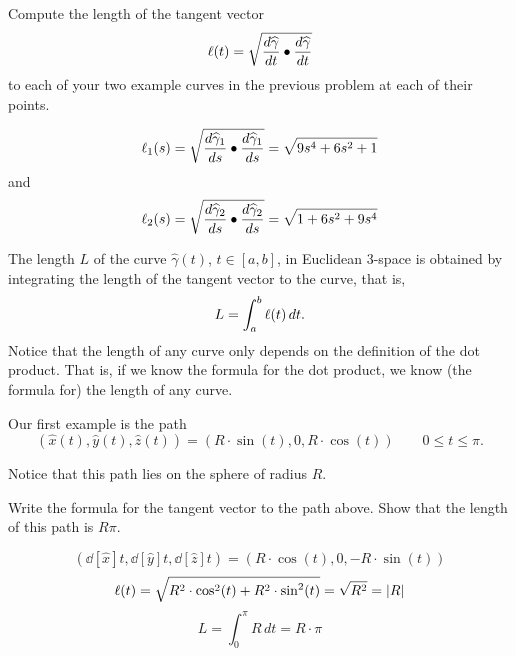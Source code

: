\documentclass[newpage,hints,handout]{ximera}
\begin{document}
\begin{problem}
Compute the length of the tangent vector
\[
\l(t)=\sqrt{\frac{d\hat{\gamma}}{dt}\bullet\frac{d\hat{\gamma}}{dt}}%
\]
to each of your two example curves in the previous problem at each of
their points.



\begin{freeResponse}
\[
\ell_{1}(s) = \sqrt{\frac{d\widehat{\gamma}_{1}}{ds}\bullet\frac{d\widehat{\gamma}_{1}}{ds}} = \sqrt{9s^4 + 6s^2 +1}
\] and
\[ 
\ell_{2}(s) = \sqrt{\frac{d\widehat{\gamma}_{2}}{ds}\bullet\frac{d\widehat{\gamma}_{2}}{ds}} = \sqrt{1 + 6s^2 +9s^4}
\]
\end{freeResponse}

\end{problem}

\begin{definition}
The length $L$ of the curve $\hat{\gamma}(t)$, $t\in[a,b] $, in Euclidean
$3$-space is obtained by integrating the length of the tangent vector
to the curve, that is,%
\[
L=\int_{a}^{b} \ell(t)  \,dt.
\]
Notice that the length of any curve only depends on the definition of the dot
product. That is, if we know the formula for the dot product, we know (the
formula for) the length of any curve.
\end{definition}

Our first example is the path%
\[
\left(\hat{x}(t),\hat{y}(t),\hat{z}(t)\right)=\left(R\cdot\sin(t),0,R\cdot\cos(t)\right) \qquad
0 \leq t\leq\pi.
\]


Notice that this path lies on the sphere of radius $R$.

\begin{problem}
  Write the formula for the tangent vector to the path above. Show that the
  length of this path is $R\pi$.

\begin{freeResponse}
\[
\left( \dd[\hat{x}]{t}, \dd[\hat{y}]{t}, \dd[\hat{z}]{t} \right) 
    = \left(R\cdot\cos(t),0,-R\cdot\sin(t) \right)
\]
\[
\ell(t) = \sqrt{
   R^2 \cdot\cos^{2}(t) + R^2 \cdot\sin^{2}(t)} 
   = \sqrt{R^2} = |R|
\]
\[
L=\int_{0}^{\pi} R \,dt = R\cdot\pi
\]
\end{freeResponse}

\end{problem}
\end{document}
